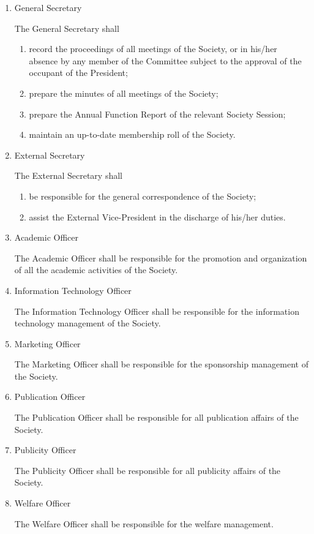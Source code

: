 \documentclass[11pt,a4paper,notitlepage]{article}
\begin{document}
\begin{enumerate}
		\item General Secretary \par
		The General Secretary shall 
			\begin{enumerate}[label=\Alph*.]
				\item record the proceedings of all meetings of the Society, or in his/her absence by any member of the Committee subject to the approval of the occupant of the President; 
				\item prepare the minutes of all meetings of the Society; 
				\item prepare the Annual Function Report of the relevant Society Session; 
				\item maintain an up-to-date membership roll of the Society. 
			\end{enumerate}
		\item External Secretary \par
		The External Secretary shall 
			\begin{enumerate}[label=\Alph*.]
				\item be responsible for the general correspondence of the Society; 
				\item assist the External Vice-President in the discharge of his/her duties. 
			\end{enumerate}
		\item Academic Officer \par
		The Academic Officer shall be responsible for the promotion and organization of all the academic activities of the Society. 
		
		\item Information Technology Officer \par		
		The Information Technology Officer shall be responsible for the information technology management of the Society. 
		
		\item Marketing Officer \par
		The Marketing Officer shall be responsible for the sponsorship management of the Society. 
		
		\item Publication Officer \par
		The Publication Officer shall be responsible for all publication affairs of the Society. 
		
		\item Publicity Officer \par
		The Publicity Officer shall be responsible for all publicity affairs of the Society. 
		
		\item Welfare Officer \par
		The Welfare Officer shall be responsible for the welfare management. 
	\end{enumerate}
	
\end{document}

